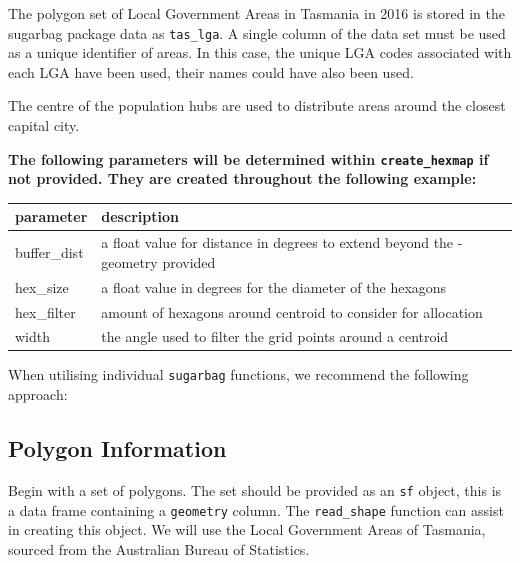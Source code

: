 The polygon set of Local Government Areas in Tasmania in 2016 is stored
in the sugarbag package data as \texttt{tas\_lga}. A single column of
the data set must be used as a unique identifier of areas. In this case,
the unique LGA codes associated with each LGA have been used, their
names could have also been used.

The centre of the population hubs are used to distribute areas around
the closest capital city.

\textbf{The following parameters will be determined within
\texttt{create\_hexmap} if not provided. They are created throughout the
following example:}

\begin{Schunk}

\begin{tabular}{l|l}
\hline
parameter & description\\
\hline
buffer\_dist & a float value for distance in degrees to extend beyond the - geometry provided\\
\hline
hex\_size & a float value in degrees for the diameter of the hexagons\\
\hline
hex\_filter & amount of hexagons around centroid to consider for allocation\\
\hline
width & the angle used to filter the grid points around a centroid\\
\hline
\end{tabular}

\end{Schunk}

When utilising individual \texttt{sugarbag} functions, we recommend the
following approach:

\hypertarget{polygon-information}{%
\subsection{Polygon Information}\label{polygon-information}}

Begin with a set of polygons. The set should be provided as an
\texttt{sf} object, this is a data frame containing a \texttt{geometry}
column. The \texttt{read\_shape} function can assist in creating this
object. We will use the Local Government Areas of Tasmania, sourced from
the Australian Bureau of Statistics.


